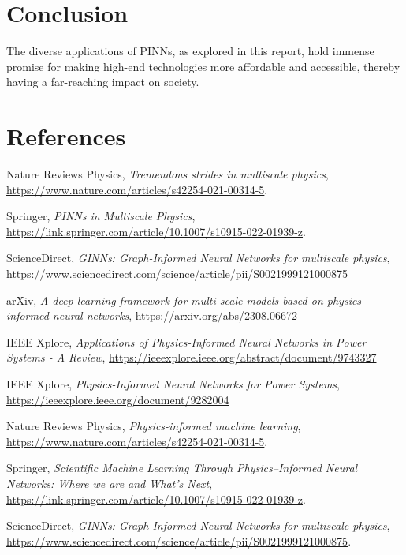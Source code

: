 \documentclass[12pt]{article}
\begin{document}
	\section{Conclusion}
	The diverse applications of PINNs, as explored in this report, hold immense promise for making high-end technologies more affordable and accessible, thereby having a far-reaching impact on society.
	
	\section{References}
	\begin{thebibliography}{9}
		
		Nature Reviews Physics,
		\textit{Tremendous strides in multiscale physics},
		\url{https://www.nature.com/articles/s42254-021-00314-5}.
		
		Springer,
		\textit{PINNs in Multiscale Physics},
		\url{https://link.springer.com/article/10.1007/s10915-022-01939-z}.
		
		ScienceDirect, 
		\textit{GINNs: Graph-Informed Neural Networks for multiscale physics}, \url{https://www.sciencedirect.com/science/article/pii/S0021999121000875}
		
		arXiv,
		\textit{A deep learning framework for multi-scale models based on physics-informed neural networks}, \url{https://arxiv.org/abs/2308.06672}

		IEEE Xplore,
		\textit{Applications of Physics-Informed Neural Networks in Power Systems - A Review}, \url{https://ieeexplore.ieee.org/abstract/document/9743327}
		
		IEEE Xplore,
		\textit{Physics-Informed Neural Networks for Power Systems}, \url{https://ieeexplore.ieee.org/document/9282004}
		
		Nature Reviews Physics,
		\textit{Physics-informed machine learning}, \url{https://www.nature.com/articles/s42254-021-00314-5}.
		
		Springer,
		\textit{Scientific Machine Learning Through Physics–Informed Neural Networks: Where we are and What’s Next}, \url{https://link.springer.com/article/10.1007/s10915-022-01939-z}.
		
		ScienceDirect,
		\textit{GINNs: Graph-Informed Neural Networks for multiscale physics}, \url{https://www.sciencedirect.com/science/article/pii/S0021999121000875}.
		

\end{thebibliography}
\end{document}
